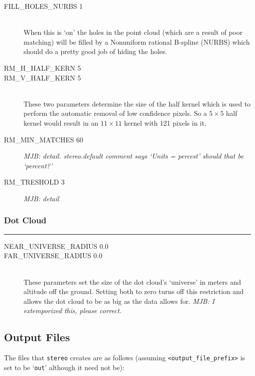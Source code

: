 \begin{description}

\item[FILL\_HOLES\_NURBS 1] \hfill \\
When this is `on' the holes in the point cloud (which are a result of poor matching) will be filled by a Nonuniform rational B-spline (NURBS) which should do a pretty good job of hiding the holes.

\item[RM\_H\_HALF\_KERN 5]
\item[RM\_V\_HALF\_KERN 5] \hfill \\
These two parameters determine the size of the half kernel which
is used to perform the automatic removal of low confidence pixels.
So a $5 \times 5$ half kernel would result in an $11 \times 11$
kernel with 121 pixels in it.

\item[RM\_MIN\_MATCHES 60]
\emph{MJB: detail.  stereo.default comment says `Units = percest'  should that be `percent?'}

\item[RM\_TRESHOLD 3]
\emph{MJB: detail}

\end{description}

\subsubsection*{Dot Cloud}
\hrule
\bigskip

\begin{description}
\item[NEAR\_UNIVERSE\_RADIUS 0.0]
\item[FAR\_UNIVERSE\_RADIUS 0.0] \hfill \\
These parameters set the size of the dot cloud's `universe' in meters and altitude off the ground.  Setting both to zero turns off this restriction and allows the dot cloud to be as big as the data allows for. \emph{MJB: I extemporized this, please correct.}

\end{description}

\subsection{Output Files}
The files that \verb=stereo= creates are as follows (assuming \verb=<output_file_prefix>= is set to be `\verb=out=' although it need not be):

